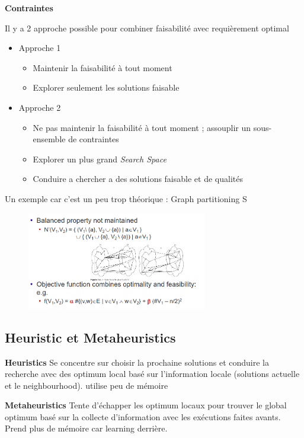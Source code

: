 		\textbf{Contraintes}
		
		Il y a 2 approche possible pour combiner faisabilité avec requièrement optimal
		\begin{itemize}
			 \item Approche 1
			 \begin{itemize}
			 	\item Maintenir la faisabilité à tout moment
			 	\item Explorer seulement les solutions faisable 
			 \end{itemize}
			 \item Approche 2
			 \begin{itemize}
			 	\item Ne pas maintenir la faisabilité à tout moment ;
assouplir un sous-ensemble de contraintes
				\item Explorer un plus grand \textit{Search Space}
				\item Conduire a chercher a des solutions faisable et de qualités
			 \end{itemize}
		\end{itemize}
		
		Un exemple car c'est un peu trop théorique : Graph partitioning
		S
		\begin{figure}[htp]
			\centering
			\includegraphics[width=0.7\textwidth]{img/exempleGraphPartionning.png}
		\end{figure}
	\subsection{Heuristic et Metaheuristics}
		\textbf{Heuristics}
		Se concentre sur choisir la prochaine solutions et conduire la recherche avec des optimum local basé sur l'information locale (solutions actuelle et le neighbourhood). utilise peu de mémoire
		
		\textbf{Metaheuristics}
		Tente d'échapper les optimum locaux pour trouver le global optimum basé sur la collecte d'information avec les exécutions faites avants. Prend plus de mémoire car learning derrière.
		
